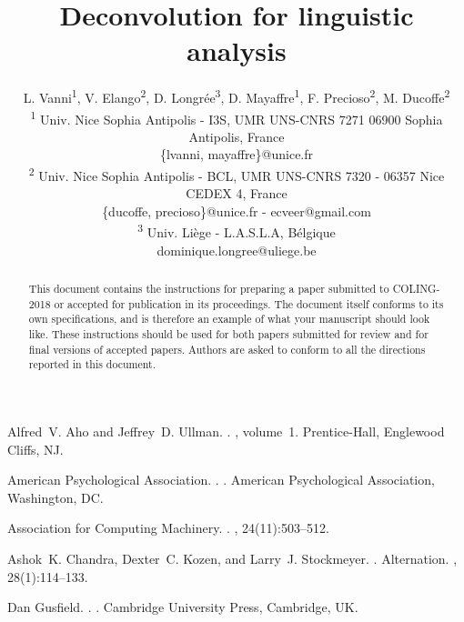 \documentclass[11pt]{article}
\title{Deconvolution for linguistic analysis}
\author{
L. Vanni\textsuperscript{1}, V. Elango\textsuperscript{2}, D. Longrée\textsuperscript{3}, D. Mayaffre\textsuperscript{1}, F. Precioso\textsuperscript{2}, M. Ducoffe\textsuperscript{2}\\
  \textsuperscript{1} Univ. Nice Sophia Antipolis - I3S, UMR UNS-CNRS 7271 06900 Sophia Antipolis, France \\
  \{lvanni, mayaffre\}@unice.fr \\
  \textsuperscript{2} Univ. Nice Sophia Antipolis - BCL, UMR UNS-CNRS 7320 - 06357 Nice CEDEX 4, France \\
  \{ducoffe, precioso\}@unice.fr - ecveer@gmail.com \\
  \textsuperscript{3} Univ. Liège - L.A.S.L.A, Bélgique \\
  dominique.longree@uliege.be\\}
\date{}
\begin{document}
\maketitle



\begin{abstract}
  This document contains the instructions for preparing a paper submitted
  to COLING-2018 or accepted for publication in its proceedings. The document itself
  conforms to its own specifications, and is therefore an example of
  what your manuscript should look like. These instructions should be
  used for both papers submitted for review and for final versions of
  accepted papers. Authors are asked to conform to all the directions
  reported in this document.
\end{abstract}











\begin{thebibliography}{}

Alfred~V. Aho and Jeffrey~D. Ullman.
.
, volume~1.
\newblock Prentice-{Hall}, Englewood Cliffs, NJ.

{American Psychological Association}.
.
.
\newblock American Psychological Association, Washington, DC.

{Association for Computing Machinery}.
.
, 24(11):503--512.

Ashok~K. Chandra, Dexter~C. Kozen, and Larry~J. Stockmeyer.
.
\newblock Alternation.
,
  28(1):114--133.

Dan Gusfield.
.
.
\newblock Cambridge University Press, Cambridge, UK.

\end{thebibliography}
\end{document}
